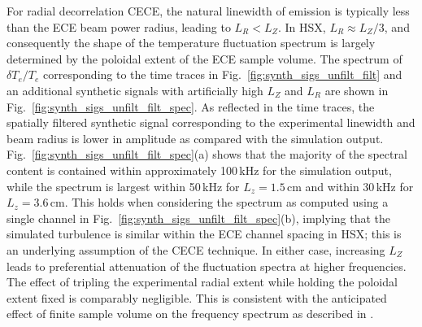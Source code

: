 \documentclass[%
 aip,
 amsmath,amssymb,
 reprint,%
]{revtex4-1}
\begin{document}

For radial decorrelation CECE, the natural linewidth of emission is typically less than the ECE beam power radius, leading to $L_R<L_Z$. In HSX, $L_R \approx L_Z/3$, and consequently the shape of the temperature fluctuation spectrum is largely determined by the poloidal extent of the ECE sample volume. The spectrum of $\delta T_e/T_e$  corresponding to the time traces in Fig.\ \ref{fig:synth_sigs_unfilt_filt} and an additional synthetic signals with artificially high $L_Z$ and $L_R$ are shown in Fig.\ \ref{fig:synth_sigs_unfilt_filt_spec}. As reflected in the time traces, the spatially filtered synthetic signal corresponding to the experimental linewidth and beam radius is lower in amplitude as compared with the simulation output. Fig.\ \ref{fig:synth_sigs_unfilt_filt_spec}(a) shows that the majority of the spectral content is contained within approximately 100\,kHz for the simulation output, while the spectrum is largest within 50\,kHz for $L_z=1.5$\,cm and within 30\,kHz for $L_z=3.6$\,cm. This holds when considering the spectrum as computed using a single channel in Fig.\ \ref{fig:synth_sigs_unfilt_filt_spec}(b), implying that the simulated turbulence is similar within the ECE channel spacing in HSX; this is an underlying assumption of the CECE technique. In either case, increasing $L_Z$ leads to preferential attenuation of the fluctuation spectra at higher frequencies. The effect of tripling the experimental radial extent while holding the poloidal extent fixed is comparably negligible. This is consistent with the anticipated effect of finite sample volume on the frequency spectrum as described in \cite{ross1991dispersion,bravenec_wootton_spatial}.
\end{document}
